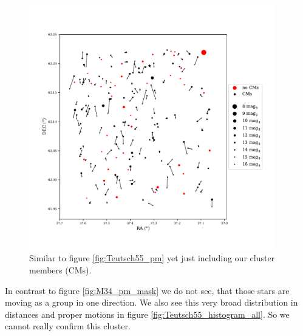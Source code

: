 \documentclass{article}
\begin{document}
\begin{figure}[H]
  \centering
    \includegraphics[trim={0 1.6cm 0 2.3cm},clip,width=0.95\textwidth]{Teutsch55_pm_mask.pdf}
  \caption{Similar to figure \ref{fig:Teutsch55_pm} yet just including our cluster members (CMs).}
  \label{fig:Teutsch55_pm_mask}
\end{figure}

In contrast to figure \ref{fig:M34_pm_mask} we do not see, that those stars are moving as a group in one direction. We also see this very broad distribution in distances and proper motions in figure \ref{fig:Teutsch55_histogram_all}. So we cannot really confirm this cluster.
\end{document}

